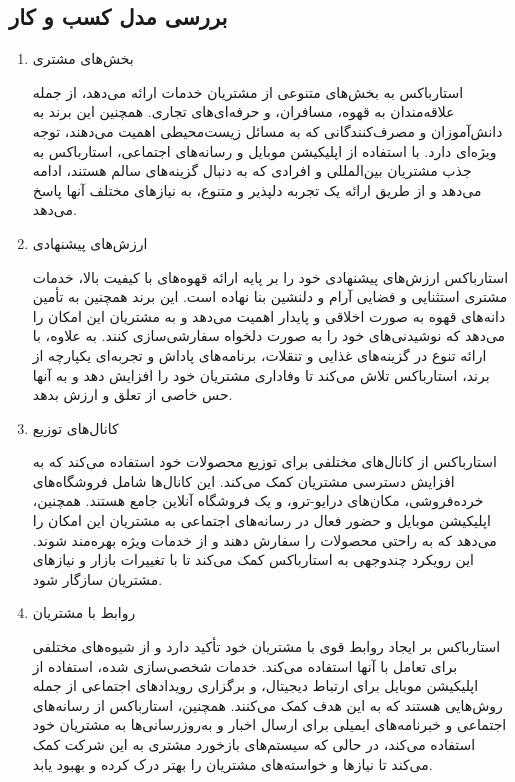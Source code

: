 \documentclass[dvipsnames, svgnames, x11names, 11pt, twocolumn]{article}
\begin{document}
\subsection{بررسی مدل کسب و کار}
\begin{enumerate}
\item 
بخش‌های مشتری

استارباکس به بخش‌های متنوعی از مشتریان خدمات ارائه می‌دهد، از جمله علاقه‌مندان به قهوه، مسافران، و حرفه‌ای‌های تجاری. همچنین این برند به دانش‌آموزان و مصرف‌کنندگانی که به مسائل زیست‌محیطی اهمیت می‌دهند، توجه ویژه‌ای دارد. با استفاده از اپلیکیشن موبایل و رسانه‌های اجتماعی، استارباکس به جذب مشتریان بین‌المللی و افرادی که به دنبال گزینه‌های سالم هستند، ادامه می‌دهد و از طریق ارائه یک تجربه دلپذیر و متنوع، به نیازهای مختلف آنها پاسخ می‌دهد.

\item 
ارزش‌های پیشنهادی

استارباکس ارزش‌های پیشنهادی خود را بر پایه ارائه قهوه‌های با کیفیت بالا، خدمات مشتری استثنایی و فضایی آرام و دلنشین بنا نهاده است. این برند همچنین به تأمین دانه‌های قهوه به صورت اخلاقی و پایدار اهمیت می‌دهد و به مشتریان این امکان را می‌دهد که نوشیدنی‌های خود را به صورت دلخواه سفارشی‌سازی کنند. به علاوه، با ارائه تنوع در گزینه‌های غذایی و تنقلات، برنامه‌های پاداش و تجربه‌ای یکپارچه از برند، استارباکس تلاش می‌کند تا وفاداری مشتریان خود را افزایش دهد و به آنها حس خاصی از تعلق و ارزش بدهد.

\item 
کانال‌های توزیع

استارباکس از کانال‌های مختلفی برای توزیع محصولات خود استفاده می‌کند که به افزایش دسترسی مشتریان کمک می‌کند. این کانال‌ها شامل فروشگاه‌های خرده‌فروشی، مکان‌های درایو-ترو، و یک فروشگاه آنلاین جامع هستند. همچنین، اپلیکیشن موبایل و حضور فعال در رسانه‌های اجتماعی به مشتریان این امکان را می‌دهد که به راحتی محصولات را سفارش دهند و از خدمات ویژه بهره‌مند شوند. این رویکرد چندوجهی به استارباکس کمک می‌کند تا با تغییرات بازار و نیازهای مشتریان سازگار شود.

\item 
روابط با مشتریان

استارباکس بر ایجاد روابط قوی با مشتریان خود تأکید دارد و از شیوه‌های مختلفی برای تعامل با آنها استفاده می‌کند. خدمات شخصی‌سازی شده، استفاده از اپلیکیشن موبایل برای ارتباط دیجیتال، و برگزاری رویدادهای اجتماعی از جمله روش‌هایی هستند که به این هدف کمک می‌کنند. همچنین، استارباکس از رسانه‌های اجتماعی و خبرنامه‌های ایمیلی برای ارسال اخبار و به‌روزرسانی‌ها به مشتریان خود استفاده می‌کند، در حالی که سیستم‌های بازخورد مشتری به این شرکت کمک می‌کند تا نیازها و خواسته‌های مشتریان را بهتر درک کرده و بهبود یابد.


\end{enumerate}
\end{document}
